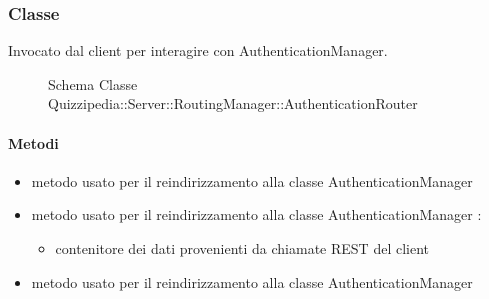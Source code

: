 \subsubsection{Classe }
Invocato dal client per interagire con AuthenticationManager.
\begin{figure}[H]
\centering
\noindent{}
\caption[Schema Classe AuthenticationRouter]{Schema Classe Quizzipedia::Server::RoutingManager::AuthenticationRouter}
\end{figure}
\paragraph{Metodi}
\begin{itemize}
\item {}
\newline
metodo usato per il reindirizzamento alla classe AuthenticationManager
\newline
\item {}
\newline
metodo usato per il reindirizzamento alla classe AuthenticationManager
\newline
{} :
\begin{itemize}
\item {}
\newline
contenitore dei dati provenienti da chiamate REST del client
\end{itemize}
\item {}
\newline
metodo usato per il reindirizzamento alla classe AuthenticationManager
\newline
\end{itemize}
